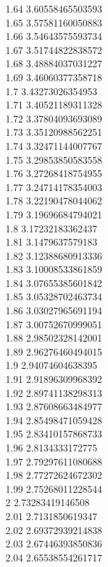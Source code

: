 {1.64	3.60558465503593\\
1.65	3.57581160050883\\
1.66	3.54643575593734\\
1.67	3.51744822838572\\
1.68	3.48884037031227\\
1.69	3.46060377358718\\
1.7	3.43273026354953\\
1.71	3.40521189311328\\
1.72	3.37804093693089\\
1.73	3.35120988562251\\
1.74	3.32471144007767\\
1.75	3.29853850583558\\
1.76	3.27268418754955\\
1.77	3.24714178354003\\
1.78	3.22190478044062\\
1.79	3.19696684794021\\
1.8	3.17232183362437\\
1.81	3.1479637579183\\
1.82	3.12388680913336\\
1.83	3.10008533861859\\
1.84	3.07655385601842\\
1.85	3.05328702463734\\
1.86	3.03027965691194\\
1.87	3.00752670999051\\
1.88	2.98502328142001\\
1.89	2.96276460494015\\
1.9	2.94074604638395\\
1.91	2.91896309968392\\
1.92	2.89741138298313\\
1.93	2.87608663484977\\
1.94	2.85498471059428\\
1.95	2.83410157868733\\
1.96	2.8134333172775\\
1.97	2.79297611080688\\
1.98	2.77272624672302\\
1.99	2.75268011228544\\
2	2.73283419146508\\
2.01	2.7131850619347\\
2.02	2.69372939214838\\
2.03	2.67446393850836\\
2.04	2.65538554261717\\
}
